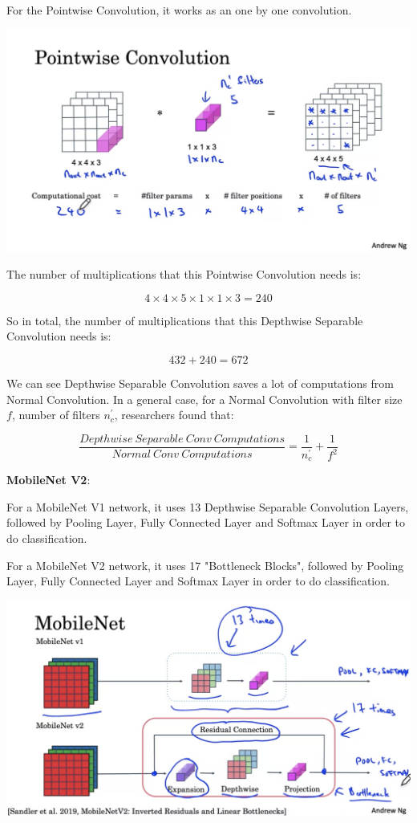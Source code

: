 \documentclass{article}
\begin{document}
\noindent For the Pointwise Convolution, it works as an one by one convolution.

\begin{center}
\includegraphics[scale=0.3]{./images/mobilenet_pointwise_conv.png}
\end{center}

\noindent The number of multiplications that this Pointwise Convolution needs is:

\[4 \times 4 \times 5 \times 1 \times 1 \times 3 = 240\]

\noindent So in total, the number of multiplications that this Depthwise Separable Convolution needs is:

\[432 + 240 = 672\]

\noindent We can see Depthwise Separable Convolution saves a lot of computations from Normal Convolution. In a general case, for a Normal Convolution with filter size \(f\), number of filters \(n_{c}^{'}\), researchers found that:

\[\frac{Depthwise \ Separable \ Conv \ Computations}{Normal \ Conv \ Computations} = \frac{1}{n_{c}^{'}} + \frac{1}{f^{2}}\]

\noindent \textbf{MobileNet V2}:

\noindent For a MobileNet V1 network, it uses 13 Depthwise Separable Convolution Layers, followed by Pooling Layer, Fully Connected Layer and Softmax Layer in order to do classification.

\bigskip

\noindent For a MobileNet V2 network, it uses 17 "Bottleneck Blocks", followed by Pooling Layer, Fully Connected Layer and Softmax Layer in order to do classification.

\begin{center}
\includegraphics[scale=0.3]{./images/mobilenet_v2_compare.png}
\end{center}
\end{document}

